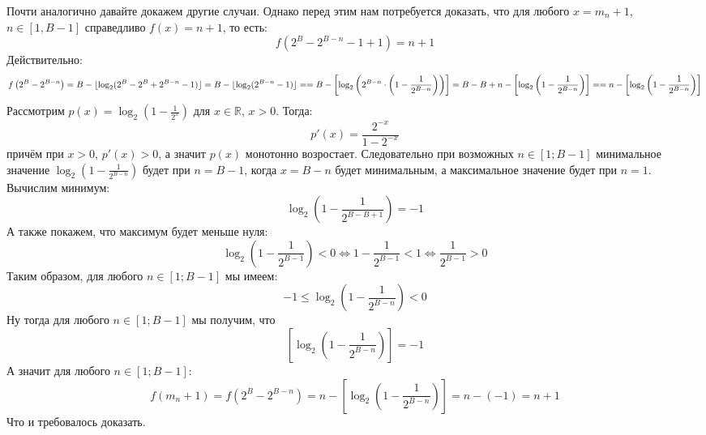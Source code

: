 Почти аналогично давайте докажем другие случаи. Однако перед этим нам потребуется доказать, что для любого \(x = m_n + 1\), \(n \in [1, B-1]\) справедливо \(f(x) = n + 1\), то есть:
\begin{dmath*}
f\left(2^{B} - 2^{B-n} - 1  + 1\right) = n + 1
\end{dmath*}
Действительно:
\begin{dmath*}
f\left(2^{B} - 2^{B-n} \right)  = B  - \lfloor \log_2(2^B - 2^{B} + 2^{B-n} - 1)\rfloor =  B  - \lfloor \log_2(2^{B-n} - 1)\rfloor 
= \\[10pt] =
B  - \left[ \log_2 \left(2^{B-n} \cdot\left(1 - \frac{1}{2^{B-n}}\right)\right)\right] = B - B + n - \left[ \log_2 \left(1 - \frac{1}{2^{B-n}} \right)\right]
= \\[10pt] =
n - \left[ \log_2 \left(1 - \frac{1}{2^{B-n}} \right) \right]
\end{dmath*}
Рассмотрим \(p(x) = \log_2 \left(1 - \frac{1}{2^{x}} \right)\) для \(x \in \mathbb{R}\), \(x > 0\). Тогда:
\begin{dmath*}
p'(x) = \frac{2^{-x}}{1 - 2^{-x}}
\end{dmath*}
причём при \(x > 0\), \(p'(x) > 0\), а значит \(p(x)\) монотонно возростает. Следовательно при возможных \(n \in [1; B-1]\) минимальное значение \(\log_2 \left(1 - \frac{1}{2^{B-n}} \right)\) будет при \(n = B - 1\), когда \(x = B-n\) будет минимальным, а максимальное значение будет при \(n = 1\). Вычислим минимум:
\begin{dmath*}
\log_2 \left(1 - \frac{1}{2^{B-B+1}} \right)= -1
\end{dmath*}
А также покажем, что максимум будет меньше нуля:
\begin{dmath*}
\log_2 \left(1 - \frac{1}{2^{B-1}} \right) < 0 \Leftrightarrow
1 - \frac{1}{2^{B-1}} < 1  \Leftrightarrow
 \frac{1}{2^{B-1}}  > 0
\end{dmath*}
Таким образом, для любого \(n\in[1;B-1]\) мы имеем:
\begin{dmath*}
-1 \le \log_2 \left(1 - \frac{1}{2^{B-n}} \right) < 0
\end{dmath*}
Ну тогда для любого \(n \in [1; B-1]\) мы получим, что
\begin{dmath*}
\left[ \log_2 \left(1 - \frac{1}{2^{B-n}} \right) \right] = -1
\end{dmath*}
А значит для любого \(n \in [1; B-1]\):
\begin{dmath*}
f(m_n +1) = f\left(2^{B} - 2^{B-n} \right)  = n - \left[ \log_2 \left(1 - \frac{1}{2^{B-n}} \right) \right]= n - (-1) = n + 1
\end{dmath*}
Что и требовалось доказать.


